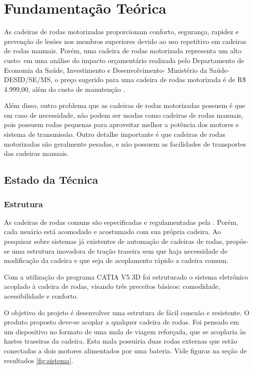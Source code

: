 \chapter{Fundamentação Teórica}\label{cap:fundamentacao_teorica}

As cadeiras de rodas motorizadas proporcionam conforto, segurança, rapidez e prevenção de lesões nos membros superiores devido ao uso repetitivo em cadeiras de rodas manuais. Porém, uma cadeira de rodas motorizada representa um alto custo: em uma análise do impacto orçamentário realizada pelo Departamento de Economia da Saúde, Investimento e Desenvolvimento- Ministério da Saúde-DESID/SE/MS, o preço sugerido para uma cadeira de rodas motorizada é de R\$ 4.999,00, além do custo de manutenção \cite{relatorio_sus}.

Além disso, outro problema que as cadeiras de rodas motorizadas possuem é que em caso de necessidade, não podem ser usadas como cadeiras de rodas manuais, pois possuem rodas pequenas para aproveitar melhor a potência dos motores e sistema de transmissão. Outro detalhe importante é que cadeiras de rodas motorizadas são geralmente pesadas, e não possuem as facilidades de transportes das cadeiras manuais.

\section{Estado da Técnica}

\subsection{Estrutura}
As cadeiras de rodas comuns são especificadas e regulamentadas pela \cite{nbr9050}. Porém, cada usuário está acomodado e acostumado com sua própria cadeira. Ao pesquisar sobre sistemas já existentes de automação de cadeiras de rodas, propôs-se uma estrutura inovadora de tração traseira sem que haja necessidade de modificação da cadeira e que seja de acoplamento rápido a cadeira comum.

Com a utilização do programa CATIA V5 3D foi estruturado o sistema eletrônico acoplado à cadeira de rodas, visando três preceitos básicos: comodidade, acessibilidade e conforto.

O objetivo do projeto é desenvolver uma estrutura de fácil conexão e resistente. O produto proposto deve-se acoplar a qualquer cadeira de rodas. Foi pensado em um dispositivo no formato de uma mala de viagem reforçada, que se acoplaria às hastes traseiras da cadeira. Esta mala possuiria duas rodas externas que estão conectadas a dois motores alimentados por uma bateria. Vide figuras na seção de resultados \ref{fig:sistema}.

